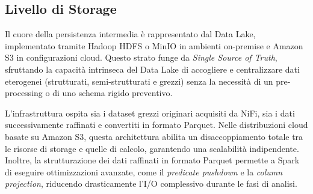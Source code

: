 \documentclass[conference]{IEEEtran}
\begin{document}
%
%
%
%
%
%

\subsection{Livello di Storage}\label{subsec:storage_layer_datalake}
Il cuore della persistenza intermedia è rappresentato dal Data Lake, implementato tramite Hadoop HDFS o MinIO in ambienti on-premise e Amazon S3 in configurazioni cloud.
Questo strato funge da \textit{Single Source of Truth}, sfruttando la capacità intrinseca del Data Lake di accogliere e centralizzare dati eterogenei (strutturati, semi-strutturati e grezzi) senza la necessità di un pre-processing o di uno schema rigido preventivo.

L'infrastruttura ospita sia i dataset grezzi originari acquisiti da NiFi, sia i dati successivamente raffinati e convertiti in formato Parquet.
Nelle distribuzioni cloud basate su Amazon S3, questa architettura abilita un disaccoppiamento totale tra le risorse di storage e quelle di calcolo, garantendo una scalabilità indipendente.
Inoltre, la strutturazione dei dati raffinati in formato Parquet permette a Spark di eseguire ottimizzazioni avanzate, come il \textit{predicate pushdown} e la \textit{column projection}, riducendo drasticamente l'I/O complessivo durante le fasi di analisi.
\end{document}
